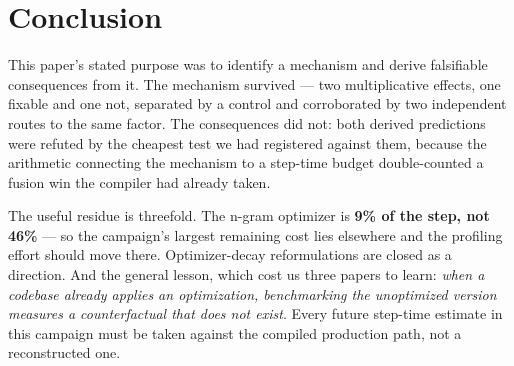 \documentclass{article}
\begin{document}
\section{Conclusion}
This paper's stated purpose was to identify a mechanism and derive falsifiable consequences from it. The mechanism survived --- two multiplicative effects, one fixable and one not, separated by a control and corroborated by two independent routes to the same factor. The consequences did not: both derived predictions were refuted by the cheapest test we had registered against them, because the arithmetic connecting the mechanism to a step-time budget double-counted a fusion win the compiler had already taken.

The useful residue is threefold. The n-gram optimizer is \textbf{9\% of the step, not 46\%} --- so the campaign's largest remaining cost lies elsewhere and the profiling effort should move there. Optimizer-decay reformulations are closed as a direction. And the general lesson, which cost us three papers to learn: \emph{when a codebase already applies an optimization, benchmarking the unoptimized version measures a counterfactual that does not exist}. Every future step-time estimate in this campaign must be taken against the compiled production path, not a reconstructed one.
\end{document}
